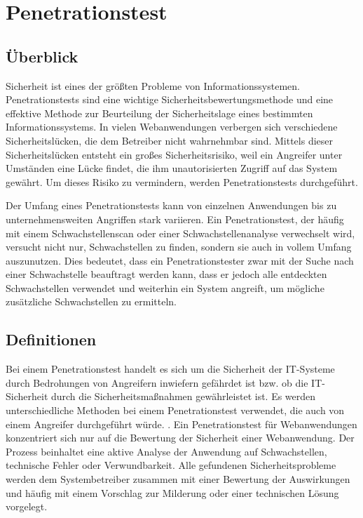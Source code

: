 \chapter{Penetrationstest}
\label{cha:k4}

\section{Überblick}

Sicherheit ist eines der größten Probleme von Informationssystemen. Penetrationstests sind eine wichtige Sicherheitsbewertungsmethode und eine effektive Methode zur Beurteilung der Sicherheitslage eines bestimmten Informationssystems. In vielen Webanwendungen verbergen sich verschiedene Sicherheitslücken, die dem Betreiber nicht wahrnehmbar sind. Mittels dieser Sicherheitslücken entsteht ein großes Sicherheitsrisiko, weil ein Angreifer unter Umständen eine Lücke findet, die ihm unautorisierten Zugriff auf das System gewährt. Um dieses Risiko zu vermindern, werden Penetrationstests durchgeführt.

Der Umfang eines Penetrationstests kann von einzelnen Anwendungen bis zu unternehmensweiten Angriffen stark variieren. Ein Penetrationstest, der häufig mit einem Schwachstellenscan oder einer Schwachstellenanalyse verwechselt wird, versucht nicht nur, Schwachstellen zu finden, sondern sie auch in vollem Umfang auszunutzen. Dies bedeutet, dass ein Penetrationstester zwar mit der Suche nach einer Schwachstelle beauftragt werden kann, dass er jedoch alle entdeckten Schwachstellen verwendet und weiterhin ein System angreift, um mögliche zusätzliche Schwachstellen zu ermitteln\cite{northcutt2006}.

\section{Definitionen}

Bei einem Penetrationstest handelt es sich um die Sicherheit der IT-Systeme durch Bedrohungen von Angreifern inwiefern gefährdet ist bzw. ob die IT-Sicherheit durch die Sicherheitsmaßnahmen gewährleistet ist. Es werden unterschiedliche Methoden bei einem Penetrationstest verwendet, die auch von einem Angreifer durchgeführt würde. \cite[5--6]{pt03bsi}. Ein Penetrationstest für Webanwendungen konzentriert sich nur auf die Bewertung der Sicherheit einer Webanwendung. Der Prozess beinhaltet eine aktive Analyse der Anwendung auf Schwachstellen, technische Fehler oder Verwundbarkeit. Alle gefundenen Sicherheitsprobleme werden dem Systembetreiber zusammen mit einer Bewertung der Auswirkungen und häufig mit einem Vorschlag zur Milderung oder einer technischen Lösung vorgelegt\cite[46]{meucci2008owasp}.

